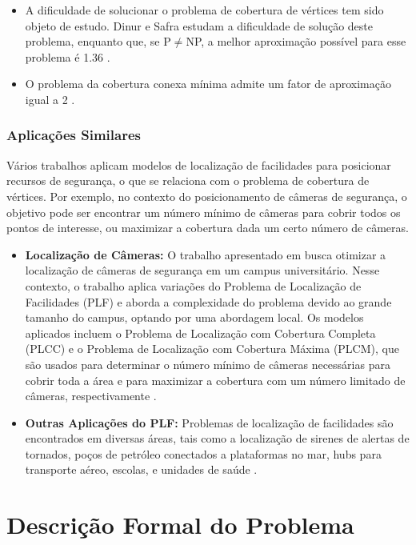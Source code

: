 \documentclass[12pt, a4paper]{report}
\begin{document}
\begin{itemize} 
  \item A dificuldade de solucionar o problema de cobertura de vértices tem sido objeto de estudo. Dinur e Safra \cite{dinur2005vertexcover} estudam a dificuldade de solução deste problema, enquanto que, se P$\neq$NP, a melhor aproximação possível para esse problema é 1.36 \cite{dinur2005vertexcover}. 
  \item O problema da cobertura conexa mínima admite um fator de aproximação igual a 2 \cite{goldbarg2012}. 
\end{itemize}

\subsection*{Aplicações Similares} 
Vários trabalhos aplicam modelos de localização de facilidades para posicionar recursos de segurança, o que se relaciona com o problema de cobertura de vértices. Por exemplo, no contexto do posicionamento de câmeras de segurança, o objetivo pode ser encontrar um número mínimo de câmeras para cobrir todos os pontos de interesse, ou maximizar a cobertura dada um certo número de câmeras. 
\begin{itemize} 
  \item \textbf{Localização de Câmeras:} O trabalho apresentado em \cite{veloso2021localizacao} busca otimizar a localização de câmeras de segurança em um campus universitário. Nesse contexto, o trabalho aplica variações do Problema de Localização de Facilidades (PLF) e aborda a complexidade do problema devido ao grande tamanho do campus, optando por uma abordagem local. Os modelos aplicados incluem o Problema de Localização com Cobertura Completa (PLCC) e o Problema de Localização com Cobertura Máxima (PLCM), que são usados para determinar o número mínimo de câmeras necessárias para cobrir toda a área e para maximizar a cobertura com um número limitado de câmeras, respectivamente \cite{veloso2021localizacao}. 
  \item \textbf{Outras Aplicações do PLF:} Problemas de localização de facilidades são encontrados em diversas áreas, tais como a localização de sirenes de alertas de tornados, poços de petróleo conectados a plataformas no mar, hubs para transporte aéreo, escolas, e unidades de saúde \cite{veloso2021localizacao}. \end{itemize}

\chapter{Descrição Formal do Problema}
\end{document}
